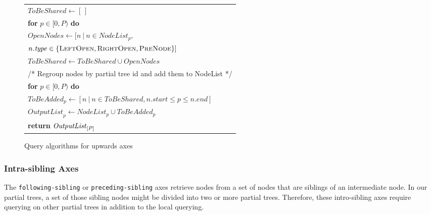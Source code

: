 {\begin{figure}[t]
\begin{tabular}{l}
		\makebox[1em][r]{2:}\hspace{1 mm} $\mathit{ToBeShared} \leftarrow [\,]$ \\
		\makebox[1em][r]{3:}\hspace{1 mm} \textbf{for} $p \in [0, P)$ \textbf{do} \\
		\makebox[1em][r]{4:}\hspace{4 mm} $ \mathit{OpenNodes} \leftarrow [n ~|~ n \in \mathit{NodeList}_p, $\\
		\makebox[1em][r]{5:}\hspace{4 mm} \phantom{$ \mathit{OpenNodes} \leftarrow [n ~|~$}$n.\mathit{type} \in \{\textsc{LeftOpen}, \textsc{RightOpen}, \textsc{PreNode}\}]$\\
		\makebox[1em][r]{6:}\hspace{4 mm} $ \mathit{ToBeShared} \leftarrow \mathit{ToBeShared} \cup \mathit{OpenNodes}$ \\[5pt]
		\makebox[1em][r]{7:}\hspace{1 mm} /* Regroup nodes by partial tree id and add them to NodeList */ \\
		\makebox[1em][r]{8:}\hspace{1 mm} \textbf{for} $p \in [0, P)$ \textbf{do} \\
		\makebox[1em][r]{9:}\hspace{4 mm}    $\mathit{ToBeAdded}_p \leftarrow [n ~|~ n \in \mathit{ToBeShared}, n.\mathit{start} \le p \le n.\mathit{end}]$ \\
		\makebox[1em][r]{10:}\hspace{4 mm}    $\mathit{OutputList}_p \leftarrow \mathit{NodeList}_p \cup \mathit{ToBeAdded}_p$ \\
		\makebox[1em][r]{11:}\hspace{1 mm} \textbf{return} $\mathit{OutputList}_{[P]}$ \\
		\hline
	\end{tabular}
        \caption{Query algorithms for upwards axes}
	\label{fig:algQueryParent2}
\end{figure}
}

\subsubsection{Intra-sibling Axes}

The \texttt{following-sibling} or \texttt{preceding-sibling} axes retrieve nodes
from a set of nodes that are siblings of an intermediate node.  In our partial
trees, a set of those sibling nodes might be divided into two or more partial
trees. Therefore, these intro-sibling axes require querying on other partial
trees in addition to the local querying.

